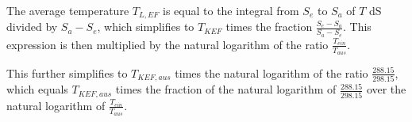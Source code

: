 The average temperature \( T_{L,EF} \) is equal to the integral from \( S_e \) to \( S_a \) of \( T \) dS divided by \( S_a - S_e \), which simplifies to \( T_{KEF} \) times the fraction \( \frac{S_e - S_a}{S_a - S_e} \). This expression is then multiplied by the natural logarithm of the ratio \( \frac{T_{ein}}{T_{aus}} \).

This further simplifies to \( T_{KEF,aus} \) times the natural logarithm of the ratio \( \frac{288.15}{298.15} \), which equals \( T_{KEF,aus} \) times the fraction of the natural logarithm of \( \frac{288.15}{298.15} \) over the natural logarithm of \( \frac{T_{ein}}{T_{aus}} \).